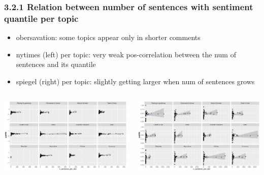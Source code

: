 \documentclass{tum-presentation}
\begin{document}
\begin{frame}
  \frametitle{3.2.1 Relation between number of sentences with sentiment quantile per topic}
  \begin{itemize}
    \item obersavation: some topics appear only in shorter comments
    \item nytimes (left) per topic: very weak pos-correlation between the num of sentences and its quantile
    \item spiegel (right) per topic: slightly getting larger when num of sentences grows
 \end{itemize}
  \begin{columns}
    \begin{minipage}[c]{\linewidth}
        \centering
        \includegraphics[width=0.95\linewidth]{figures/num_commentsentences_quantile_perclusterny_cluster_weight.pdf}
    \end{minipage}
    \begin{minipage}[c]{\linewidth}
        \centering
        \includegraphics[width=0.95\linewidth]{figures/num_commentsentences_quantile_perclustersp_cluster_weight.pdf}
    \end{minipage}
\end{columns}
\end{frame}
\end{document}
